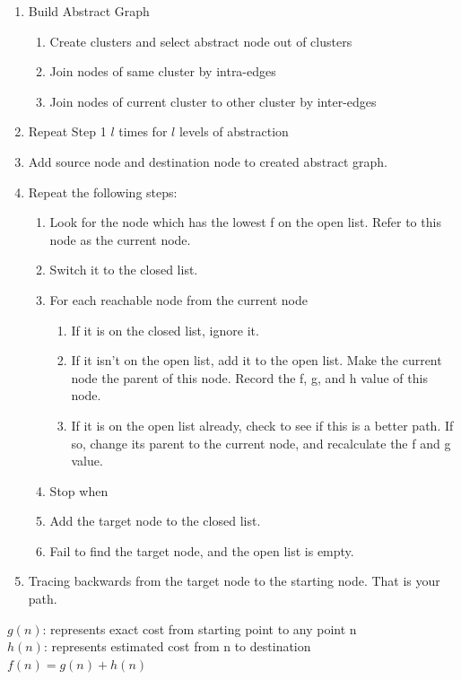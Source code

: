 \documentclass[a4paper, 12pt]{article}
\begin{document}
\begin{enumerate}
  \item Build Abstract Graph
	\begin {enumerate}
	  \item Create clusters and select abstract node out of clusters
	  \item Join nodes of same cluster by intra-edges
	  \item Join nodes of current cluster to other cluster by inter-edges
	\end {enumerate}
  \item Repeat Step 1 $l$ times for $l$ levels of abstraction
  \item Add source node and destination node to created abstract graph.
  \item Repeat the following steps:
	\begin{enumerate}
		\item Look for the node which has the lowest f on the open list. Refer to this node as the current node.
		\item Switch it to the closed list.
		\item For each reachable node from the current node
			\begin{enumerate}
			\item If it is on the closed list, ignore it.
			\item If it isn’t on the open list, add it to the open list. Make the current node the parent of this node. Record the f, g, and h value of this node.
			\item If it is on the open list already, check to see if this is a better path. If so, change its parent to the current node, and recalculate the f and g value.
			\end{enumerate}
		\item Stop when
			\item Add the target node to the closed list.
			\item Fail to find the target node, and the open list is empty.
	\end{enumerate}
  \item Tracing backwards from the target node to the starting node. That is your path.
\end{enumerate}
$ g(n) $: represents exact cost from starting point to any point n \\
$ h(n) $: represents estimated cost from n to destination \\
$ f(n)=g(n)+h(n) $
\\
\end{document}
